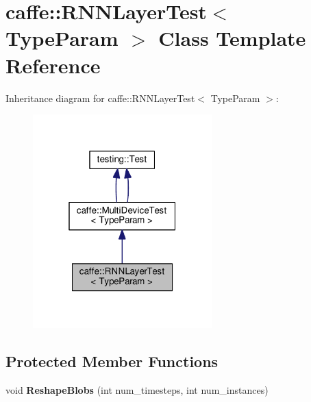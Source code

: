 \hypertarget{classcaffe_1_1_r_n_n_layer_test}{}\section{caffe\+:\+:R\+N\+N\+Layer\+Test$<$ Type\+Param $>$ Class Template Reference}
\label{classcaffe_1_1_r_n_n_layer_test}


Inheritance diagram for caffe\+:\+:R\+N\+N\+Layer\+Test$<$ Type\+Param $>$\+:
\nopagebreak
\begin{figure}[H]
\begin{center}
\leavevmode
\includegraphics[width=196pt]{classcaffe_1_1_r_n_n_layer_test__inherit__graph}
\end{center}
\end{figure}
\subsection*{Protected Member Functions}
\begin{DoxyCompactItemize}
\item 
\mbox{\label{classcaffe_1_1_r_n_n_layer_test_abef15e06080a62ade7db5056707c9fb1}} 
void {\bfseries Reshape\+Blobs} (int num\+\_\+timesteps, int num\+\_\+instances)
\end{DoxyCompactItemize}
